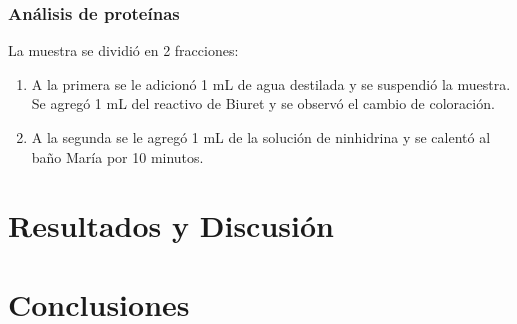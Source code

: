 \documentclass[fleqn,10pt]{SelfArx}
\begin{document}
		\subsubsection{Análisis de proteínas}
			La muestra se dividió en 2 fracciones:
			\begin{enumerate}
				\item A la primera se le adicionó 1 mL de agua destilada y se suspendió la muestra. Se agregó 1 mL del reactivo de Biuret y se observó el cambio de coloración.
				\item A la segunda se le agregó 1 mL de la solución de ninhidrina y se calentó al baño María por 10 minutos.
			\end{enumerate}

\section{Resultados y Discusi\'on}

\section{Conclusiones}





\end{document}
